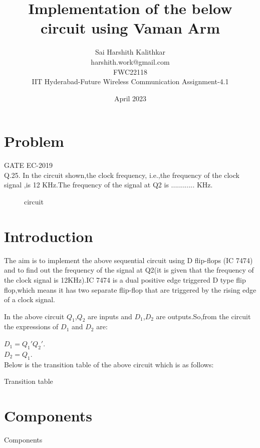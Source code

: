 \documentclass{article}
\title{Implementation of the below circuit using Vaman Arm}
\date{April 2023}
\author{Sai Harshith Kalithkar\\harshith.work@gmail.com\\FWC22118\\IIT Hyderabad-Future Wireless Communication Assignment-4.1}
\begin{document}
\maketitle
	\tableofcontents

\pagebreak

\section{Problem}
	{GATE EC-2019}\\
	Q.25. In the circuit shown,the clock frequency, i.e.,the frequency of the clock signal ,is 12 KHz.The frequency of the signal at Q2 is ............ KHz.
	\begin{figure}[h]
	\centering
		
		\caption{circuit}
		\label{fig:1}
	\end{figure}

\section{Introduction}
		
		The aim is to implement the above sequential circuit using D flip-flops (IC 7474) and to find out the frequency of the signal at Q2(it is given that the frequency of the clock signal is 12KHz).IC 7474 is a dual positive edge triggered D type flip flop,which means it has two separate flip-flop that are triggered by the rising edge of a clock signal.

		In the above circuit $Q_1$,$Q_2$ are inputs and $D_1$,$D_2$ are outputs.So,from the circuit the expressions of $D_1$ and $D_2$ are:

		$D_1 = Q_1'Q_2'$.\\
			$D_2 = Q_1$.\\

Below is the transition table of the above circuit which is as follows:
\pagebreak

	\begin{table}[h]
		\begin{center}
			
			\caption{Transition table}
			\label{table:2}
		\end{center}
	\end{table}

\section{Components}
	
	\begin{table}[h]
		\begin{center}
			
			\caption{Components}
			\label{table:1}
		\end{center}
	\end{table}
\end{document}
